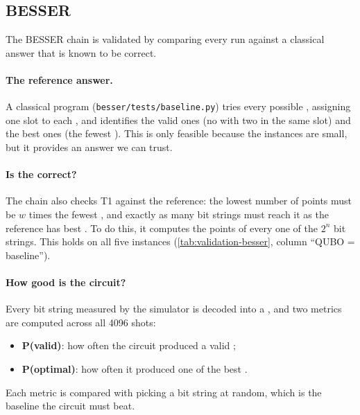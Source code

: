 \subsection*{BESSER}

The BESSER chain is validated by comparing every run against a classical answer that is known to be correct.

\paragraph{The reference answer.} A classical program (\texttt{besser/tests/baseline.py}) tries every possible , assigning one slot to each , and identifies the valid ones (no  with two  in the same slot) and the best ones (the fewest ). This is only feasible because the instances are small, but it provides an answer we can trust.

\paragraph{Is the  correct?} The chain also checks T1 against the reference: the lowest number of points must be $w$ times the fewest , and exactly as many bit strings must reach it as the reference has best . To do this, it computes the points of every one of the $2^n$ bit strings. This holds on all five instances (\cref{tab:validation-besser}, column ``QUBO = baseline'').

\paragraph{How good is the circuit?} Every bit string measured by the simulator is decoded into a , and two metrics are computed across all 4096 shots:
\begin{itemize}[nosep]
	\item \textbf{P(valid)}: how often the circuit produced a valid ;
	\item \textbf{P(optimal)}: how often it produced one of the best .
\end{itemize}
Each metric is compared with picking a bit string at random, which is the baseline the circuit must beat.

